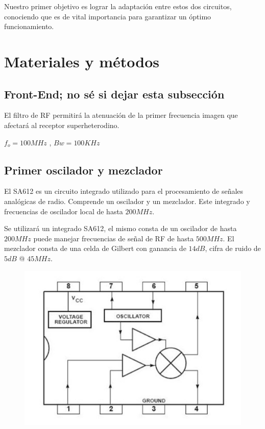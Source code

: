 \documentclass{article}
\begin{document}
Nuestro primer objetivo es lograr la adaptación entre estos dos circuitos, conociendo que es de vital importancia para garantizar un óptimo funcionamiento.
 
\section{Materiales y métodos}

\subsection{Front-End; \textbf{no sé si dejar esta subsección}}

El filtro de RF permitirá la atenuación de la primer frecuencia imagen que afectará al receptor superheterodino. 

\begin{center}
$f_o = 100MHz$ , $Bw = 100KHz$
\end{center}


\subsection{Primer oscilador y mezclador}
El SA612 es un circuito integrado utilizado para el procesamiento
de señales analógicas de radio. Comprende un oscilador y un mezclador. Este integrado y
frecuencias de oscilador local de hasta $200 MHz$.

Se utilizará un integrado SA612, el mismo consta de un oscilador de hasta $200MHz$ puede manejar frecuencias de señal de RF de hasta $500 MHz$. El mezclador consta de una celda de Gilbert con ganancia de $14 dB$, cifra de ruido de $5dB$ @ $45MHz$.

\begin{figure}[H]
  \centering
    \includegraphics[scale=0.55]{SA612}
  \caption{  }
\end{figure}
\end{document}
